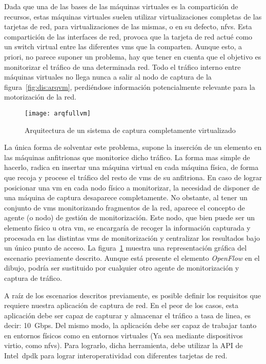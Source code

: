 Dada que una de las bases de las máquinas virtuales es la compartición de recursos, estas máquinas virtuales suelen utilizar virtualizaciones completas de las tarjetas de red, para virtualizaciones de las mismas, o en su defecto, \glspl{nfv}. Esta compartición de las interfaces de red, provoca que la tarjeta de red actué como un switch virtual entre las diferentes \glspl{vm} que la comparten. Aunque esto, a priori, no parece suponer un problema, hay que tener en cuenta que el objetivo es monitorizar el tráfico de una determinada red. Todo el tráfico interno entre máquinas virtuales no llega nunca a salir al nodo de captura de la figura~\ref{fig:dis:arqvm}, perdiéndose información potencialmente relevante para la motorización de la red.


\begin{figure}[!th]
\centering
\texttt{[image: arqfullvm]}
\caption{Arquitectura de un sistema de captura completamente virtualizado}
\label{fig:dis:arqfullvm}
\end{figure}

La única forma de solventar este problema, supone la inserción de un elemento en las máquinas anfitrionas que monitorice dicho tráfico. La forma mas simple de hacerlo, radica en insertar una máquina virtual en cada máquina física, de forma que recoja y procese el tráfico del resto de \glspl{vm} de su anfitriona.
En caso de lograr posicionar una \gls{vm} en cada nodo físico a monitorizar, la necesidad de disponer de una máquina de captura desaparece completamente. No obstante, al tener un conjunto de \glspl{vm} monitorizando fragmentos de la red, aparece el concepto de agente (o nodo) de gestión de monitorización. Este nodo, que bien puede ser un elemento físico u otra \gls{vm}, se encargaría de recoger la información capturada y procesada en las distintas \glspl{vm} de monitorización y centralizar los resultados bajo un único punto de acceso. La figura~\ref{fig:dis:arqfullvm} muestra una representación gráfica del escenario previamente descrito. Aunque está presente el elemento \textit{OpenFlow} en el dibujo, podría ser sustituido por cualquier otro agente de monitorización y captura de tráfico.


A raíz de los escenarios descritos previamente, es posible definir los requisitos que requiere nuestra aplicación de captura de red.
En el peor de los casos, esta aplicación debe ser capaz de capturar y almacenar el tráfico a tasa de linea, es decir: 10~Gbps.
Del mismo modo, la aplicación debe ser capaz de trabajar tanto en entornos físicos como en entornos virtuales (Ya sea mediante dispositivos \gls{virtio}, como \glspl{nfv}).
Para lograrlo, dicha herramienta, debe utilizar la API de Intel~\gls{dpdk} para lograr interoperatividad con diferentes tarjetas de red.

